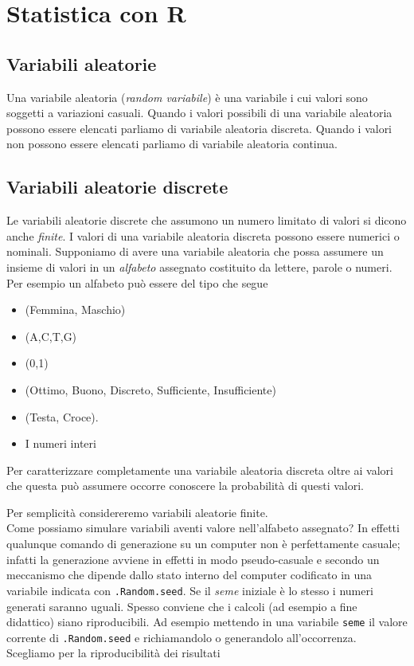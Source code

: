 \documentclass[onecolumn,12pt]{book}
\author{Federico Comoglio e  Maurizio Rinaldi}
\begin{document}

\markright{\today}
\thispagestyle{empty}
\maketitle
\newpage
\thispagestyle{empty}
\tableofcontents
\newpage
\thispagestyle{empty}
 \mainmatter
\chapter{Statistica con \textsf{R}}
\section{Variabili aleatorie}
Una variabile aleatoria (\emph{random variabile}) \`e
 una variabile i cui valori sono soggetti a variazioni casuali. Quando i valori possibili di una variabile aleatoria  possono essere elencati parliamo di variabile aleatoria discreta. Quando i valori non possono essere elencati parliamo di variabile aleatoria continua.

\section{Variabili aleatorie discrete}
Le variabili aleatorie  discrete che  assumono un numero limitato di valori si dicono anche \emph{finite}.  I valori di una variabile aleatoria discreta possono essere numerici o nominali.
 Supponiamo di avere una variabile aleatoria che possa assumere un insieme di valori in  un \emph{alfabeto} assegnato costituito da lettere, parole o numeri. Per esempio un alfabeto pu\`o essere del tipo che segue
\begin{itemize}
\item{}(Femmina, Maschio)
\item{}(A,C,T,G)
\item{} (0,1)
\item{}(Ottimo, Buono, Discreto, Sufficiente, Insufficiente)
\item{} (Testa, Croce).
\item{} I numeri interi
\end{itemize}
Per caratterizzare completamente una variabile aleatoria discreta oltre ai valori che questa può  assumere occorre conoscere la probabilità  di questi valori.


Per semplicit\`a considereremo variabili aleatorie finite.\\
Come possiamo simulare variabili aventi valore nell'alfabeto assegnato?
In effetti qualunque comando di generazione su un computer non \`e perfettamente casuale; infatti la generazione avviene in effetti in modo pseudo-casuale e  secondo un meccanismo che dipende dallo stato interno del computer codificato in una variabile indicata con \texttt{.Random.seed}. Se il {\it seme} iniziale \`e lo stesso i numeri generati saranno uguali. Spesso conviene che i calcoli (ad esempio a fine didattico) siano riproducibili. Ad esempio mettendo in una variabile \texttt{seme} il valore corrente di \texttt{.Random.seed} e richiamandolo o generandolo all'occorrenza. Scegliamo per la riproducibilit\`a dei risultati
\end{document}
